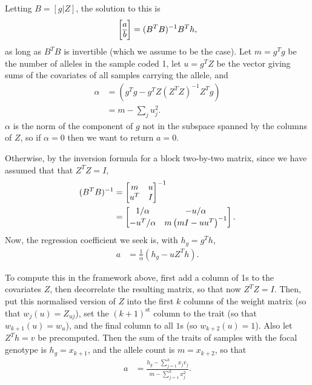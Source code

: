 \documentclass{article}
\begin{document}
Letting $B = [g | Z]$, the solution to this is
\begin{align*}
    \left[\begin{array}{@{}c@{}}a\\\hline b\end{array}\right]
        = (B^T B)^{-1} B^T h ,
\end{align*}
as long as $B^T B$ is invertible (which we assume to be the case).
Let $m = g^T g$ be the number of alleles in the sample coded 1,
let $u = g^T Z$ be the vector giving sums of the covariates of all samples carrying the allele,
and
\begin{align*}
    \alpha
    &=
        (g^T g - g^T Z (Z^T Z)^{-1} Z^T g) \\
    &=
        m - \sum_j u_j^2 .
\end{align*}
$\alpha$ is the norm of the component of $g$ not in the subspace spanned by the columns of $Z$,
so if $\alpha = 0$ then we want to return $a=0$.

Otherwise, by the inversion formula for a block two-by-two matrix,
since we have assumed that that $Z^T Z = I$,
\begin{align*}
    (B^T B)^{-1}
    &=
    \left[
        \begin{array}{@{}cc@{}}
            m & u \\
            u^T & I
        \end{array}
    \right]^{-1} \\
    &=
    \left[
        \begin{array}{@{}cc@{}}
            1/\alpha
            &
            - u / \alpha
            \\
            - u^T / \alpha
            &
            m \left(m I - u u^T \right)^{-1}
        \end{array}
    \right] .
\end{align*}
Now, the regression coefficient we seek is,
with $h_g = g^T h$,
\begin{align*}
    a
    &=
    \frac{1}{\alpha} \left(
        h_g - u Z^T h
    \right) .
\end{align*}

To compute this in the framework above,
first add a column of 1s to the covariates $Z$,
then decorrelate the resulting matrix, so that now $Z^T Z = I$.
Then, put this normalised version of $Z$
into the first $k$ columns of the weight matrix (so that $w_j(u) = Z_{uj}$),
set the $(k+1)^\text{st}$ column to the trait (so that $w_{k+1}(u) = w_u$),
and the final column to all $1$s (so $w_{k+2}(u) = 1$).
Also let $Z^T h = v$ be precomputed.
Then the sum of the traits of samples with the focal genotype is $h_g = x_{k+1}$,
and the allele count is $m = x_{k+2}$,
so that
\begin{align*}
    a
    &=
    \frac{
        h_g - \sum_{j=1}^k x_j v_j
    }{
        m - \sum_{j=1}^k x_j^2 } .
\end{align*}
\end{document}
